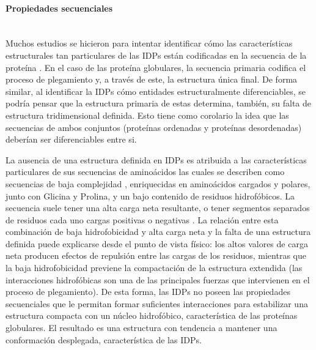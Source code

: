 \paragraph{Propiedades secuenciales} \hspace{0pt} \\
\indent Muchos estudios se hicieron para intentar identificar cómo las características estructurales tan particulares de las IDPs están codificadas en la secuencia de la proteína \cite{uversky2000natively}.
En el caso de las proteína globulares, la secuencia primaria codifica el proceso de plegamiento y, a través de este, la estructura única final. 
De forma similar, al identificar la IDPs cómo entidades estructuralmente diferenciables, se podría pensar que la estructura primaria de estas determina, también, su falta de estructura tridimensional definida.
Esto tiene como corolario la idea que las secuencias de ambos conjuntos (proteínas ordenadas y proteínas desordenadas) deberían ser diferenciables entre si.

La ausencia de una estructura definida en IDPs es atribuida a las características particulares de sus secuencias de aminoácidos las cuales se describen como secuencias de baja complejidad \cite{weathers2004reduced}, enriquecidas en aminoácidos 
cargados y polares, junto con Glicina y Prolina, y un bajo contenido de residuos hidrofóbicos. 
La secuencia suele tener una alta carga neta resultante, o tener segmentos separados de residuos cada uno cargas positivas o negativas \cite{mao2010net}.
La relación entre esta combinación de baja hidrofobicidad y alta carga neta y la falta de una estructura definida puede explicarse desde el punto de vista físico:
los altos valores de carga neta producen efectos de repulsión entre las cargas de los residuos, mientras que la baja hidrofobicidad previene la compactación de la estructura extendida 
(las interacciones hidrofóbicas son una de las principales fuerzas que intervienen en el proceso de plegamiento).
De esta forma, las IDPs no poseen las propiedades secuenciales que le permitan formar suficientes interacciones para estabilizar una estructura compacta con un núcleo hidrofóbico, característica de las proteínas globulares.
El resultado es una estructura con tendencia a mantener una conformación desplegada, característica de las IDPs.

